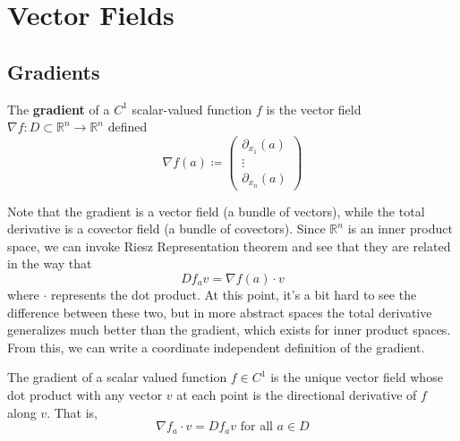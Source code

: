 \section{Vector Fields} 

\subsection{Gradients}

  \begin{definition}[Gradient]
		The \textbf{gradient} of a $C^1$ scalar-valued function $f$ is the vector field $\nabla f: D \subset \mathbb{R}^n \longrightarrow \mathbb{R}^n$ defined 
		\begin{equation}
			\nabla f(a) \coloneqq \begin{pmatrix} \partial_{x_1} (a) \\ \vdots \\ \partial_{x_n} (a) \end{pmatrix}
		\end{equation}
  \end{definition}

  Note that the gradient is a vector field (a bundle of vectors), while the total derivative is a covector field (a bundle of covectors). Since $\mathbb{R}^n$ is an inner product space, we can invoke Riesz Representation theorem and see that they are related in the way that 
	\begin{equation}
  	D f_a v = \nabla f (a) \cdot v
	\end{equation}
  where $\cdot$ represents the dot product. At this point, it's a bit hard to see the difference between these two, but in more abstract spaces the total derivative generalizes much better than the gradient, which exists for inner product spaces. From this, we can write a coordinate independent definition of the gradient. 

  \begin{definition}[Gradient]
		The gradient of a scalar valued function $f \in C^1$ is the unique vector field whose dot product with any vector $v$ at each point is the directional derivative of $f$ along $v$. That is, 
		\begin{equation}
			\nabla f_a \cdot v = D f_a v \text{ for all } a \in D
		\end{equation}
  \end{definition}

